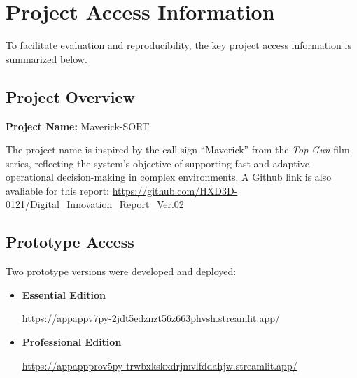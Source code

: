 
\appendix


\section{Project Access Information}
\label{app:access}

To facilitate evaluation and reproducibility, the key project access information is summarized below.

\subsection{Project Overview}

\textbf{Project Name:} Maverick-SORT

The project name is inspired by the call sign ``Maverick'' from the \textit{Top Gun} film series, reflecting the system's objective of supporting fast and adaptive operational decision-making in complex environments. A Github link is also avaliable for this report: 
\textcolor{blue}{\url{https://github.com/HXD3D-0121/Digital_Innovation_Report_Ver.02}}





\subsection{Prototype Access}

Two prototype versions were developed and deployed:

\begin{itemize}
\item \textbf{Essential Edition}

\url{https://appappv7py-2jdt5edznzt56z663phvsh.streamlit.app/}

\item \textbf{Professional Edition}

\url{https://appappprov5py-trwbxkskxdrjmvlfddahjw.streamlit.app/}

\end{itemize}

